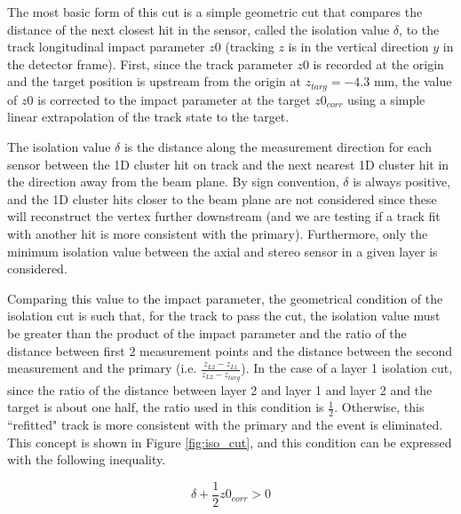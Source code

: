 The most basic form of this cut is a simple geometric cut that compares the distance of the next closest hit in the sensor, called the isolation value $\delta$, to the track longitudinal impact parameter $z0$ (tracking $z$ is in the vertical direction $y$ in the detector frame). First, since the track parameter $z0$ is recorded at the origin and the target position is upstream from the origin at $z_{targ}=-4.3$ mm, the value of $z0$ is corrected to the impact parameter at the target $z0_{corr}$ using a simple linear extrapolation of the track state to the target.


The isolation value $\delta$ is the distance along the measurement direction for each sensor between the 1D cluster hit on track and the next nearest 1D cluster hit in the direction away from the beam plane. By sign convention, $\delta$ is always positive, and the 1D cluster hits closer to the beam plane are not considered since these will reconstruct the vertex further downstream (and we are testing if a track fit with another hit is more consistent with the primary). Furthermore, only the minimum isolation value between the axial and stereo sensor in a given layer is considered.

Comparing this value to the impact parameter, the geometrical condition of the isolation cut is such that, for the track to pass the cut, the isolation value must be greater than the product of the impact parameter and the ratio of the distance between first 2 measurement points and the distance between the second measurement and the primary (i.e. $\frac{z_{L2}-z_{L1}}{z_{L2}-z_{targ}}$). In the case of a layer 1 isolation cut, since the ratio of the distance between layer 2 and layer 1 and layer 2 and the target is about one half, the ratio used in this condition is $\frac{1}{2}$. Otherwise, this ``refitted" track is more consistent with the primary and the event is eliminated. This concept is shown in Figure \ref {fig:iso_cut}, and this condition can be expressed with the following inequality.

\begin{equation}
    \delta + \frac{1}{2}z0_{corr}> 0
    \label{equ:iso_basic}
\end{equation}


